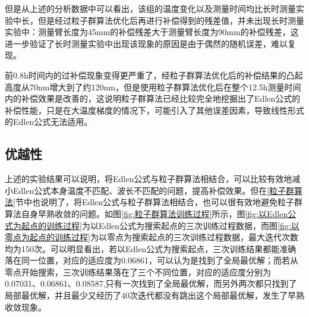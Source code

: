 但是从上述的分析数据中可以看出，该组的温度变化以及测量时间均比长时测量实验中长，但是经过粒子群算法优化后再进行补偿得到的残差值，并未出现长时测量实验中：测量臂长度为45mm的补偿残差大于测量臂长度为90mm的补偿残差，这进一步验证了长时测量实验中出现该现象的原因是由于偶然的随机误差，难以复现。

前0.8h时间内的过补偿现象变得更严重了，经粒子群算法优化后的补偿结果的凸起高度从70nm增大到了约120nm，但是使用粒子群算法优化后在整个12.5h测量时间内的补偿效果是改善的，这说明粒子群算法已经比较完全地挖掘出了Edlen公式的补偿性能，只是在大温度梯度的情况下，可能引入了其他误差因素，导致线性形式的Edlen公式无法适用。

\subsection{优越性}
上述的实验结果可以说明，将Edlen公式与粒子群算法相结合，可以比较有效地减小Edlen公式本身温度不匹配、波长不匹配的问题，提高补偿效果。但在\ref{粒子群算法}节中也说明了，将Edlen公式与粒子群算法相结合，也可以很有效地避免粒子群算法自身早熟收敛的问题。如图\ref{fig:粒子群算法训练过程}所示，图\ref{fig:以Edlen公式为起点的训练过程}为以Edlen公式为搜索起点的三次训练过程数据，而图\ref{fig:以零点为起点的训练过程}为以零点为搜索起点的三次训练过程数据，最大迭代次数均为150次。可以明显看出，若以Edlen公式为搜索起点，三次训练结果都能准确落在同一位置，对应的适应度为0.06861，可以认为是找到了全局最优解；而若从零点开始搜索，三次训练结果落在了三个不同位置，对应的适应度分别为0.07031、0.06861、0.08587,只有一次找到了全局最优解，而另外两次都只找到了局部最优解，并且最少又经历了40次迭代都没有跳出这个局部最优解，发生了早熟收敛现象。

